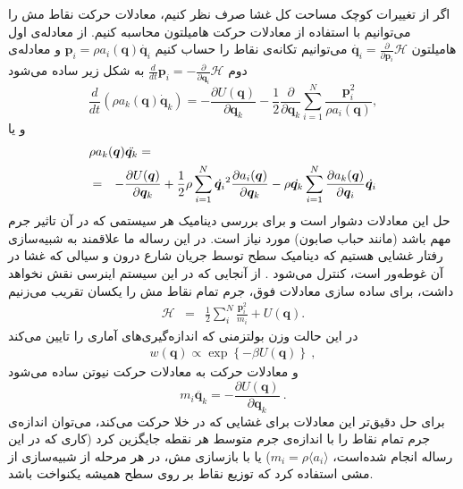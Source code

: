 اگر از تغییرات کوچک مساحت کل غشا صرف نظر کنیم، معادلات حرکت نقاط مش را می‌توانیم با استفاده از معادلات حرکت هامیلتون محاسبه کنیم. از معادله‌ی اول هامیلتون 
$\dot {\bm q_i}=\frac{\partial}{\partial \bm p_i}\mathcal H$
می‌توانیم تکانه‌ی نقاط را حساب کنیم
$\bm p_i = \rho a_i(\bm q)\dot {\bm q_i}$
 و معادله‌ی دوم 
$\frac{d}{dt} \bm p_i = -\frac{\partial}{\partial \bm q_i}\mathcal H$
به شکل زیر ساده می‌شود
\begin{equation}
\frac{d}{dt}(\rho a_k(\bm q) \dot {\bm q}_k) = -\frac{\partial U(\bm q)}{\partial \bm q_k} - \frac{1}{2} \frac{\partial}{\partial \bm q_k}\sum_{i=1}^N\frac{\bm p_i^2}{\rho a_i(\bm q)},
\end{equation}
و یا
\begin{eqnarray}
\lefteqn{  \rho a_k(\bm q) \ddot{\bm q_k}  =}
\label{eq:HamiltonianGeneralEOMMomentum}\\
 &=& -\frac{\partial U(\bm q)}{\partial \bm q_k} + \frac{1}{2}\rho \sum_{i=1}^N\dot{\bm q_i}^2\frac{\partial a_i(\bm q)}{\partial \bm q_k}
 - \rho  \dot{\bm q_k}\sum_{i=1}^N\frac{\partial a_k(\bm q)}{\partial \bm q_i}\dot{\bm q_i}\nonumber
\end{eqnarray}
حل این معادلات دشوار است و برای بررسی دینامیک هر سیستمی که در آن تاثیر جرم مهم باشد (مانند حباب صابون) مورد نیاز است. در این رساله ما علاقمند به شبیه‌سازی رفتار غشایی هستیم که دینامیک سطح توسط جریان شارع درون و سیالی که غشا در آن غوطه‌ور است، کنترل می‌شود
\cite{milnersafranPRA1987, schneider1984}.
 از آنجایی که در این سیستم اینرسی نقش نخواهد داشت، برای ساده سازی معادلات فوق، جرم تمام نقاط مش را یکسان تقریب می‌زنیم
\begin{eqnarray}
\mathcal H&=& \frac12 \sum_i^N \frac{\bm p_i^2}{m_i} + U(\bm q) 
\label{eq:HamiltonianFixedMass} .
\end{eqnarray}
در این حالت وزن بولتزمنی که اندازه‌گیری‌های آماری را تایین می‌کند
\begin{equation}
\begin{aligned}
w(\bm q)\propto\exp\left\{-\beta U(\bm q)\right\} \ ,
\end{aligned}
\label{eq:microStateProbability HamiltonianFixedMass}
\end{equation}
و معادلات حرکت به معادلات حرکت نیوتن ساده می‌شود
\begin{equation}
m_i \ddot{\bm q_k} = -\frac{\partial U(\bm q)}{\partial \bm q_k} \ .
\label{eq:EoM for HamiltonianFixedMass}
\end{equation}
برای حل دقیق‌تر این معادلات برای غشایی که در خلا حرکت می‌کند، می‌توان اندازه‌ی جرم تمام نقاط را با اندازه‌ی جرم متوسط هر نقطه جایگزین کرد (کاری که در این رساله انجام شده‌است، 
$m_i = \rho \langle a_i \rangle$)
یا با بازسازی مش، در هر مرحله از شبیه‌سازی از مشی‌ استفاده کرد که توزیع نقاط بر روی سطح همیشه یکنواخت باشد.





 










